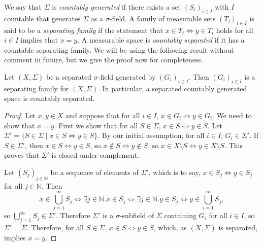 \documentclass{lmcs}
\newcommand{\N}{\ensuremath{\mathbb{N}}}
\begin{document}
We say that $\Sigma$ is \emph{countably generated} if there exists a set $(S_i)_{i \in I}$ with $I$ countable that generates $\Sigma$ as a $\sigma$-field. A family of measurable sets $(T_i)_{i \in I}$ is said to be a \emph{separating family} if the statement that $x \in T_i \Leftrightarrow y \in T_i$ holds for all $i \in I$ implies that $x = y$. A measurable space is \emph{countably separated} if it has a countable separating family. We will be using the following result without comment in future, but we give the proof now for completeness.
\begin{lem}
\label{GenFamImpliesSepFamLemma}
Let $(X,\Sigma)$ be a separated $\sigma$-field generated by $(G_i)_{i \in I}$. Then $(G_i)_{i \in I}$ is a separating family for $(X,\Sigma)$. In particular, a separated countably generated space is countably separated. 
\end{lem}
\begin{proof}
Let $x,y \in X$ and suppose that for all $i \in I$, $x \in G_i \Leftrightarrow y \in G_i$. We need to show that $x = y$. First we show that for all $S \in \Sigma$, $x \in S \Leftrightarrow y \in S$. Let $\Sigma' = \{ S \in \Sigma \mid x \in S \Leftrightarrow y \in S \}$. By our initial assumption, for all $i \in I$, $G_i \in \Sigma'$. If $S \in \Sigma'$, then $x \in S \Leftrightarrow y \in S$, so $x \not\in S \Leftrightarrow y \not\in S$, so $x \in X \setminus S \Leftrightarrow y \in X \setminus S$. This proves that $\Sigma'$ is closed under complement.

Let $(S_j)_{j \in \N}$ be a sequence of elements of $\Sigma'$, which is to say, $x \in S_j \Leftrightarrow y \in S_j$ for all $j \in \N$. Then
\[
x \in \bigcup_{j = 1}^\infty S_j \Leftrightarrow \exists j \in \N . x \in S_j \Leftrightarrow \exists j \in \N . y \in S_j \Leftrightarrow y \in \bigcup_{i=1}^\infty S_j,
\]
so $\bigcup_{j = 1}^\infty S_j \in \Sigma'$. Therefore $\Sigma'$ is a $\sigma$-subfield of $\Sigma$ containing $G_i$ for all $i \in I$, so $\Sigma' = \Sigma$. Therefore, for all $S \in \Sigma$, $x \in S \Leftrightarrow y \in S$, which, as $(X,\Sigma)$ is separated, implies $x =y$. 
\end{proof}
\end{document}
